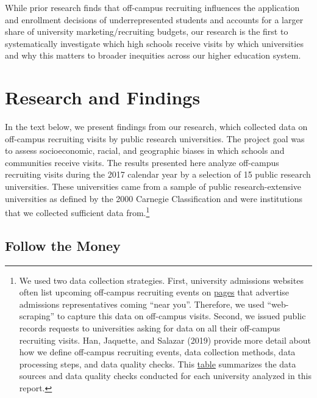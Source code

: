 \documentclass{article}
\begin{document}
While prior research finds that off-campus recruiting influences the application and enrollment decisions of underrepresented students and accounts for a larger share of university marketing/recruiting budgets, our research is the first to systematically investigate which high schools receive visits by which universities and why this matters to broader inequities across our higher education system.

\section*{Research and Findings}

In the text below, we present findings from our research, which collected data on off-campus recruiting visits by public research universities. The project goal was to assess socioeconomic, racial, and geographic biases in which schools and communities receive visits. The results presented here analyze off-campus recruiting visits during the 2017 calendar year by a selection of 15 public research universities. These universities came from a sample of public research-extensive universities as defined by the 2000 Carnegie Classification and were institutions that we collected sufficient data from.\footnote{We used two data collection strategies. First, university admissions websites often list upcoming off-campus recruiting events on \href{https://cyouh95.github.io/third-way-report/assets/html/uga.html}{pages} that advertise admissions representatives coming ``near you''. Therefore, we used ``web-scraping'' to capture this data on off-campus visits. Second, we issued public records requests to universities asking for data on all their off-campus recruiting visits. Han, Jaquette, and Salazar (2019) provide more detail about how we define off-campus recruiting events, data collection methods, data processing steps, and data quality checks. This \href{https://ozanj.github.io/joyce_report/\#/slide-4}{table} summarizes the data sources and data quality checks conducted for each university analyzed in this report.}

\subsection*{Follow the Money}
\end{document}
